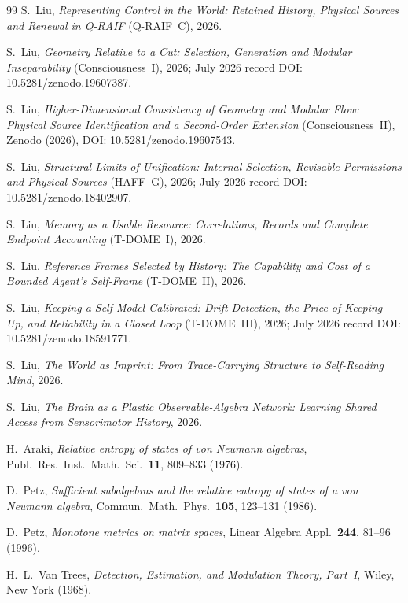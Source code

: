 \documentclass[12pt]{article}
\theoremstyle{definition}
\theoremstyle{remark}
\begin{document}
\begin{thebibliography}{99}
S.~Liu, \emph{Representing Control in the World: Retained History, Physical Sources and Renewal in Q-RAIF} (Q-RAIF~C), 2026.


S.~Liu, \emph{Geometry Relative to a Cut: Selection, Generation and Modular Inseparability} (Consciousness~I), 2026; July 2026 record DOI: 10.5281/zenodo.19607387.

S.~Liu, \emph{Higher-Dimensional Consistency of Geometry and Modular Flow: Physical Source Identification and a Second-Order Extension} (Consciousness~II), Zenodo (2026), DOI: 10.5281/zenodo.19607543.

S.~Liu, \emph{Structural Limits of Unification: Internal Selection, Revisable Permissions and Physical Sources} (HAFF~G), 2026; July 2026 record DOI: 10.5281/zenodo.18402907.

S.~Liu, \emph{Memory as a Usable Resource: Correlations, Records and Complete Endpoint Accounting} (T-DOME~I), 2026.

S.~Liu, \emph{Reference Frames Selected by History: The Capability and Cost of a Bounded Agent's Self-Frame} (T-DOME~II), 2026.

S.~Liu, \emph{Keeping a Self-Model Calibrated: Drift Detection, the Price of Keeping Up, and Reliability in a Closed Loop} (T-DOME~III), 2026; July 2026 record DOI: 10.5281/zenodo.18591771.

S.~Liu, \emph{The World as Imprint: From Trace-Carrying Structure to Self-Reading Mind}, 2026.

S.~Liu, \emph{The Brain as a Plastic Observable-Algebra Network: Learning Shared Access from Sensorimotor History}, 2026.

H.~Araki,
\emph{Relative entropy of states of von Neumann algebras},
Publ.\ Res.\ Inst.\ Math.\ Sci.\ \textbf{11}, 809--833 (1976).

D.~Petz,
\emph{Sufficient subalgebras and the relative entropy of states of a von Neumann algebra},
Commun.\ Math.\ Phys.\ \textbf{105}, 123--131 (1986).

D.~Petz,
\emph{Monotone metrics on matrix spaces},
Linear Algebra Appl.\ \textbf{244}, 81--96 (1996).

H.~L.~Van Trees,
\emph{Detection, Estimation, and Modulation Theory, Part~I},
Wiley, New York (1968).


\end{thebibliography}
\end{document}
